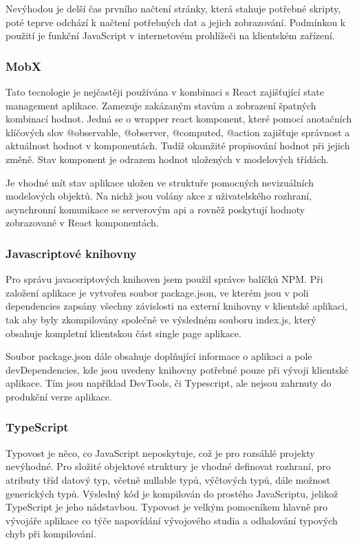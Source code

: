 \documentclass[FM,BP]{tulthesis}
\begin{document}
                Nevýhodou je delší čas prvního načtení stránky, která stahuje potřebné skripty, poté teprve odchází k načtení potřebných dat a jejich zobrazování. 
                Podmínkou k použití je funkční JavaScript v internetovém prohlížeči na klientském zařízení. \cite{7}

            \subsubsection{MobX}
                Tato tecnologie je nejčastěji používána v kombinaci s React zajišťující state management aplikace. 
                Zamezuje zakázaným stavům a zobrazení špatných kombinací hodnot. 
                Jedná se o wrapper react komponent, které pomocí anotačních klíčových slov @observable, @observer, @computed, @action zajišťuje správnost a aktuálnost hodnot v komponentách. 
                Tudíž okamžité propisování hodnot při jejich změně. 
                Stav komponent je odrazem hodnot uložených v  modelových třídách.

                Je vhodné mít stav aplikace uložen ve struktuře pomocných nevizuálních modelových objektů. 
                Na nichž jsou volány akce z uživatelského rozhraní, asynchronní komunikace se serverovým api a rovněž poskytují hodnoty zobrazované v React komponentách.\cite{8}

            \subsubsection{Javascriptové knihovny}
                Pro správu javacsriptových knihoven jsem použil správce balíčků NPM. 
                Při založení aplikace je vytvořen soubor package.json, ve kterém jsou v poli dependencies zapsány všechny závislosti na externí knihovny v klientské aplikaci, 
                tak aby byly zkompilovány společně ve výsledném souboru index.js, který obsahuje kompletní klientskou část single page aplikace. \cite{9}

                Soubor package.json dále obsahuje doplňující informace o aplikaci a pole devDependencies, 
                kde jsou uvedeny knihovny potřebné pouze při vývoji klientské aplikace. 
                Tím jsou například DevTools, či Typescript, ale nejsou zahrnuty do produkční verze aplikace. \cite{10}

            \subsubsection{TypeScript}
                Typovost je něco, co JavaScript neposkytuje, což je pro rozsáhlé projekty nevýhodné.
                Pro složité objektové struktury je vhodné definovat rozhraní, pro atributy tříd datový typ, včetně nullable typů, výčtových typů, dále možnost generických typů. 
                Výsledný kód je kompilován do prostého JavaScriptu, jelikož TypeScript je jeho nádstavbou. 
                Typovost je velkým pomocníkem hlavně pro vývojáře aplikace co týče napovídání vývojového studia a odhalování typových chyb při kompilování. \cite{11}
\end{document}

